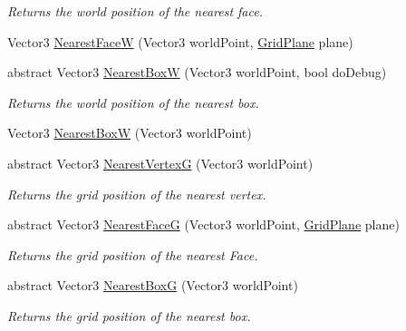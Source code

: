 \begin{DoxyCompactItemize}
\begin{DoxyCompactList}\small\item\em Returns the world position of the nearest face.\end{DoxyCompactList}\item 
Vector3 \hyperlink{class_g_f_grid_a1f2eb3cedcd2d4f82e23d222136f7743_a1f2eb3cedcd2d4f82e23d222136f7743}{Nearest\+Face\+W} (Vector3 world\+Point, \hyperlink{namespace_grid_framework_aa55de93079e09bd55c4cb660025820d5_aa55de93079e09bd55c4cb660025820d5}{Grid\+Plane} plane)
\item 
abstract Vector3 \hyperlink{class_g_f_grid_a02fcf02269ca5a2064acccecde9819eb_a02fcf02269ca5a2064acccecde9819eb}{Nearest\+Box\+W} (Vector3 world\+Point, bool do\+Debug)
\begin{DoxyCompactList}\small\item\em Returns the world position of the nearest box.\end{DoxyCompactList}\item 
Vector3 \hyperlink{class_g_f_grid_aec31996a483acd023c775658a78d5435_aec31996a483acd023c775658a78d5435}{Nearest\+Box\+W} (Vector3 world\+Point)
\item 
abstract Vector3 \hyperlink{class_g_f_grid_a7eaa2821cf118bb4821bd2cbf40029da_a7eaa2821cf118bb4821bd2cbf40029da}{Nearest\+Vertex\+G} (Vector3 world\+Point)
\begin{DoxyCompactList}\small\item\em Returns the grid position of the nearest vertex.\end{DoxyCompactList}\item 
abstract Vector3 \hyperlink{class_g_f_grid_aac129f3df1da5cdbc31143ecc7db35d2_aac129f3df1da5cdbc31143ecc7db35d2}{Nearest\+Face\+G} (Vector3 world\+Point, \hyperlink{namespace_grid_framework_aa55de93079e09bd55c4cb660025820d5_aa55de93079e09bd55c4cb660025820d5}{Grid\+Plane} plane)
\begin{DoxyCompactList}\small\item\em Returns the grid position of the nearest Face.\end{DoxyCompactList}\item 
abstract Vector3 \hyperlink{class_g_f_grid_adb7c70449b2449c1e82132e6300cc1a5_adb7c70449b2449c1e82132e6300cc1a5}{Nearest\+Box\+G} (Vector3 world\+Point)
\begin{DoxyCompactList}\small\item\em Returns the grid position of the nearest box.\end{DoxyCompactList}\item 

\end{DoxyCompactItemize}
